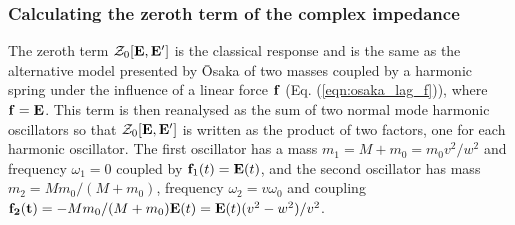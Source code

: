 \subsubsection{Calculating the zeroth term of the complex impedance}
\label{subsubsec:2-3-1-2}

The zeroth term $\mathcal{Z}_0[\vb{E}, \vb{E}']$ is the classical response and is the same as the alternative model presented by \=Osaka of two masses coupled by a harmonic spring under the influence of a linear force $\vb{f}$ (Eq. (\ref{eqn:osaka_lag_f})), where $\vb{f} = \vb{E}$. This term is then reanalysed as the sum of two normal mode harmonic oscillators so that $\mathcal{Z}_0[\vb{E}, \vb{E}']$ is written as the product of two factors, one for each harmonic oscillator. The first oscillator has a mass $m_1 = M + m_0 = m_0 v^2 / w^2$ and frequency $\omega_1 = 0$ coupled by $\vb{f}_1(t) = \vb{E}(t)$, and the second oscillator has mass $m_2 = M m_0 / (M + m_0)$, frequency $\omega_2 = v \omega_0$ and coupling $\vb{f_2(t)} = - M m_0 / (M + m_0) \vb{E}(t) = \vb{E}(t) (v^2 - w^2) / v^2$. 

